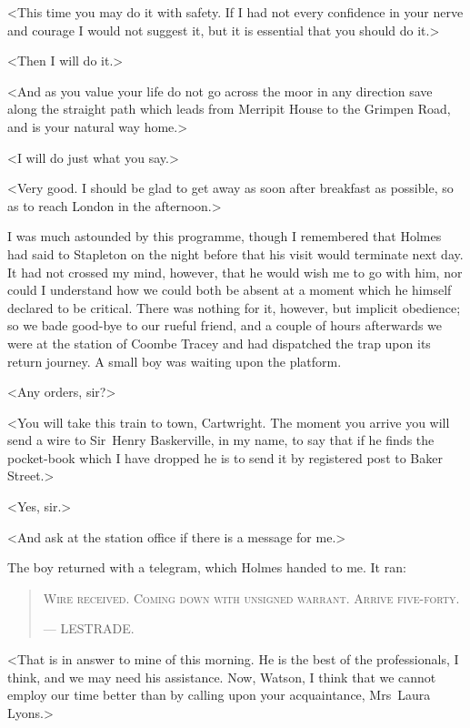 <This time you may do it with safety. If I had not every confidence in your nerve and courage I would not suggest it, but it is essential that you should do it.>

<Then I will do it.>

<And as you value your life do not go across the moor in any direction save along the straight path which leads from Merripit House to the Grimpen Road, and is your natural way home.>

<I will do just what you say.>

<Very good. I should be glad to get away as soon after breakfast as possible, so as to reach London in the afternoon.>

I was much astounded by this programme, though I re\-mem\-bered that Holmes had said to Stapleton on the night before that his visit would terminate next day. It had not crossed my mind, however, that he would wish me to go with him, nor could I understand how we could both be absent at a moment which he himself declared to be critical. There was nothing for it, however, but implicit obedience; so we bade good-bye to our rueful friend, and a couple of hours afterwards we were at the station of Coombe Tracey and had dispatched the trap upon its return journey. A small boy was waiting upon the platform.

<Any orders, sir?>

<You will take this train to town, Cartwright. The moment you arrive you will send a wire to Sir~Henry Baskerville, in my name, to say that if he finds the pocket-book which I have dropped he is to send it by registered post to Baker Street.>

<Yes, sir.>

<And ask at the station office if there is a message for me.>

The boy returned with a telegram, which Holmes handed to me. It ran: 
\begin{samepage}
\blockquote{
\textsc{Wire received. Coming down with unsigned warrant. Arrive five-forty.}
\begin{flushright}
—  {\small\scshape LESTRADE\@.}
\end{flushright}
}
\end{samepage}

<That is in answer to mine of this morning. He is the best of the professionals, I think, and we may need his assistance. Now, Watson, I think that we cannot employ our time better than by calling upon your acquaintance, Mrs~Laura Lyons.>

